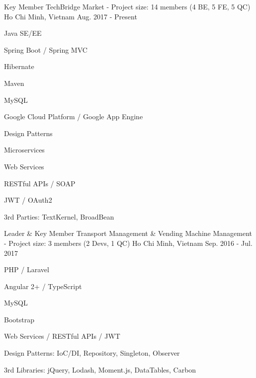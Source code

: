 

\begin{cventries}

  \cventry
    {Key Member} %
    {TechBridge Market - Project size: 14 members (4 BE, 5 FE, 5 QC)} %
    {Ho Chi Minh, Vietnam} %
    {Aug. 2017 - Present} %
    {
      \begin{cvitems} %
        \item {Java SE/EE}
        \item {Spring Boot / Spring MVC}
        \item {Hibernate}
        \item {Maven}
        \item {MySQL}
        \item {Google Cloud Platform / Google App Engine}
        \item {Design Patterns}
        \item {Microservices}
        \item {Web Services}
        \item {RESTful APIs / SOAP}
        \item {JWT / OAuth2}
        \item {3rd Parties: TextKernel, BroadBean}
      \end{cvitems}
    }

  \cventry
    {Leader \& Key Member} %
    {Transport Management \& Vending Machine Management - Project size: 3 members (2 Devs, 1 QC)} %
    {Ho Chi Minh, Vietnam} %
    {Sep. 2016 - Jul. 2017} %
    {
      \begin{cvitems} %
        \item {PHP / Laravel}
        \item {Angular 2+ / TypeScript}
        \item {MySQL}
        \item {Bootstrap}
        \item {Web Services / RESTful APIs / JWT}
        \item {Design Patterns: IoC/DI, Repository, Singleton, Observer}
        \item {3rd Libraries: jQuery, Lodash, Moment.js, DataTables, Carbon}
      \end{cvitems}
    }


\end{cventries}

